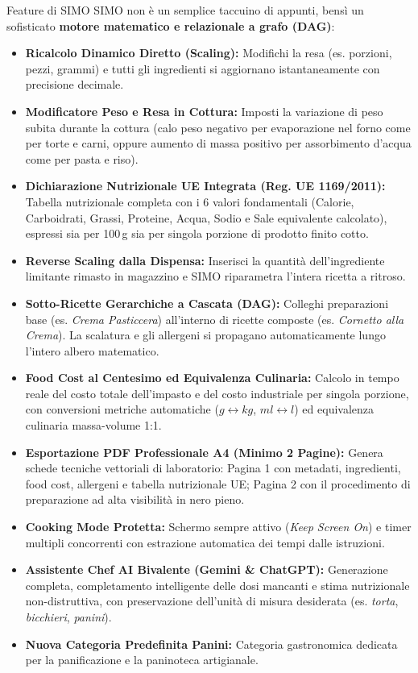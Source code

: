 \documentclass[11pt,a4paper]{article}
\begin{document}
\begin{simobox}{Feature di SIMO}
SIMO non \`e un semplice taccuino di appunti, bens\`i un sofisticato \textbf{motore matematico e relazionale a grafo (DAG)}:
\begin{itemize}[leftmargin=*,noitemsep]
    \item \textbf{Ricalcolo Dinamico Diretto (Scaling):} Modifichi la resa (es. porzioni, pezzi, grammi) e tutti gli ingredienti si aggiornano istantaneamente con precisione decimale.
    \item \textbf{Modificatore Peso e Resa in Cottura:} Imposti la variazione di peso subita durante la cottura (calo peso negativo per evaporazione nel forno come per torte e carni, oppure aumento di massa positivo per assorbimento d'acqua come per pasta e riso).
    \item \textbf{Dichiarazione Nutrizionale UE Integrata (Reg. UE 1169/2011):} Tabella nutrizionale completa con i 6 valori fondamentali (Calorie, Carboidrati, Grassi, Proteine, Acqua, Sodio e Sale equivalente calcolato), espressi sia per 100\,g sia per singola porzione di prodotto finito cotto.
    \item \textbf{Reverse Scaling dalla Dispensa:} Inserisci la quantit\`a dell'ingrediente limitante rimasto in magazzino e SIMO riparametra l'intera ricetta a ritroso.
    \item \textbf{Sotto-Ricette Gerarchiche a Cascata (DAG):} Colleghi preparazioni base (es. \textit{Crema Pasticcera}) all'interno di ricette composte (es. \textit{Cornetto alla Crema}). La scalatura e gli allergeni si propagano automaticamente lungo l'intero albero matematico.
    \item \textbf{Food Cost al Centesimo ed Equivalenza Culinaria:} Calcolo in tempo reale del costo totale dell'impasto e del costo industriale per singola porzione, con conversioni metriche automatiche ($g \leftrightarrow kg$, $ml \leftrightarrow l$) ed equivalenza culinaria massa-volume 1:1.
    \item \textbf{Esportazione PDF Professionale A4 (Minimo 2 Pagine):} Genera schede tecniche vettoriali di laboratorio: Pagina 1 con metadati, ingredienti, food cost, allergeni e tabella nutrizionale UE; Pagina 2 con il procedimento di preparazione ad alta visibilit\`a in nero pieno.
    \item \textbf{Cooking Mode Protetta:} Schermo sempre attivo (\textit{Keep Screen On}) e timer multipli concorrenti con estrazione automatica dei tempi dalle istruzioni.
    \item \textbf{Assistente Chef AI Bivalente (Gemini \& ChatGPT):} Generazione completa, completamento intelligente delle dosi mancanti e stima nutrizionale non-distruttiva, con preservazione dell'unit\`a di misura desiderata (es. \textit{torta}, \textit{bicchieri}, \textit{panini}).
    \item \textbf{Nuova Categoria Predefinita Panini:} Categoria gastronomica dedicata per la panificazione e la paninoteca artigianale.
\end{itemize}
\end{simobox}
\end{document}

